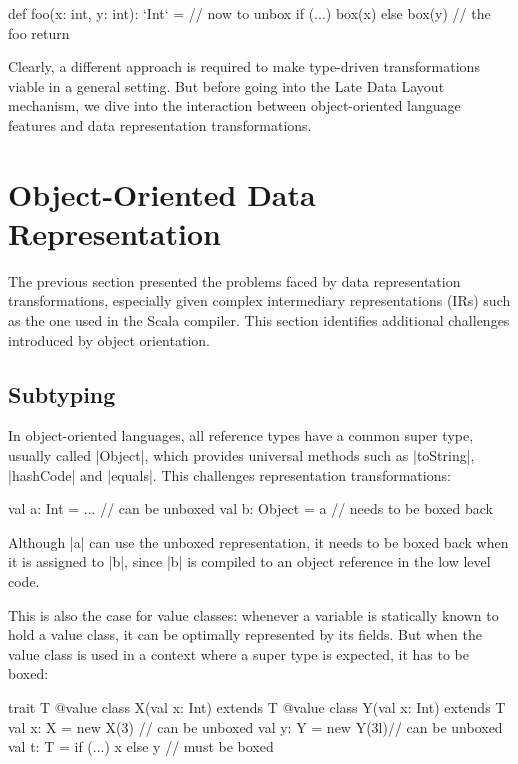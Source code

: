 \begin{lstlisting-nobreak}
 def foo(x: int, y: int): `Int` = // now to unbox
   if (...) box(x) else box(y) // the foo return
\end{lstlisting-nobreak}

Clearly, a different approach is required to make type-driven transformations viable in a general setting. But before going into the Late Data Layout mechanism, we dive into the interaction between object-oriented language features and data representation transformations.

\section{Object-Oriented Data Representation}
\label{ldl:sec:problem-oo}

The previous section presented the problems faced by data representation transformations, especially given complex intermediary representations (IRs) such as the one used in the Scala compiler. This section identifies additional challenges introduced by object orientation.

\subsection{Subtyping}

\label{ldl:sec:problem-oo/subtyping}
In object-oriented languages, all reference types have a common super type, usually called |Object|, which provides universal methods such as |toString|, |hashCode| and |equals|. This challenges representation transformations:

\begin{lstlisting-nobreak}
 val a: Int = ...        // can be unboxed
 val b: Object = a // needs to be boxed back
\end{lstlisting-nobreak}

Although |a| can use the unboxed representation, it needs to be boxed back when it is assigned to |b|, since |b| is compiled to an object reference in the low level code.

This is also the case for value classes: whenever a variable is statically known to hold a value class, it can be optimally represented by its fields. But when the value class is used in a context where a super type is expected, it has to be boxed:

\begin{lstlisting-nobreak}
 trait T
 @value class X(val x: Int) extends T
 @value class Y(val x: Int) extends T
 val x: X = new X(3)  // can be unboxed
 val y: Y = new Y(3l)// can be unboxed
 val t: T = if (...) x else y // must be boxed
\end{lstlisting-nobreak}

